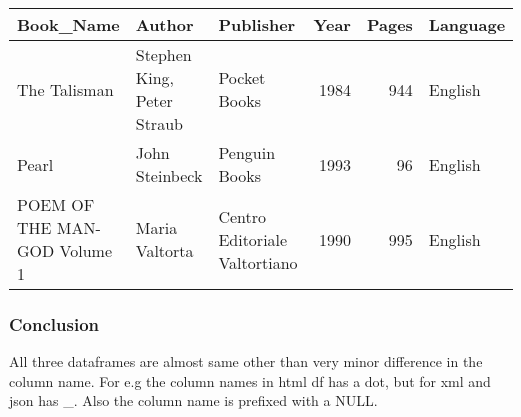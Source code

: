 \documentclass[]{article}
\newenvironment{Shaded}{\begin{snugshade}}{\end{snugshade}}
\newcommand{\KeywordTok}[1]{\textcolor[rgb]{0.13,0.29,0.53}{\textbf{#1}}}
\newcommand{\StringTok}[1]{\textcolor[rgb]{0.31,0.60,0.02}{#1}}
\newcommand{\CommentTok}[1]{\textcolor[rgb]{0.56,0.35,0.01}{\textit{#1}}}
\newcommand{\OperatorTok}[1]{\textcolor[rgb]{0.81,0.36,0.00}{\textbf{#1}}}
\newcommand{\NormalTok}[1]{#1}
\begin{document}
\begin{Shaded}
\end{Shaded}

\begin{table}[H]
\centering\begin{table}

\centering
\begin{tabular}[t]{l|l|l|r|r|l}
\hline
Book\_Name & Author & Publisher & Year & Pages & Language\\
\hline
The Talisman & Stephen King, Peter Straub & Pocket Books & 1984 & 944 & English\\
\hline
Pearl & John Steinbeck & Penguin Books & 1993 & 96 & English\\
\hline
POEM OF THE MAN-GOD Volume 1 & Maria Valtorta & Centro Editoriale Valtortiano & 1990 & 995 & English\\
\hline
\end{tabular}
\end{table}
\end{table}

\subsubsection{Conclusion}\label{conclusion}

All three dataframes are almost same other than very minor difference in
the column name. For e.g the column names in html df has a dot, but for
xml and json has \_. Also the column name is prefixed with a NULL.
\end{document}
